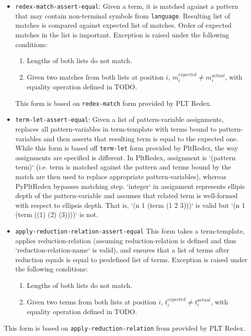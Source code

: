 \begin{itemize}
\item \texttt{redex-match-assert-equal}: Given a term, it is matched against a pattern that may contain non-terminal symbols from \texttt{language}. Resulting list of matches is compared against expected list of matches. Order of expected matches in the list is important. Exception is raised under the following conditions:
	\begin{enumerate}
	\item Lengths of both lists do not match.
	\item Given two matches from both lists at position $i$, $m_i^{expected} \neq m_i^{actual}$, with equality operation defined in TODO.
	\end{enumerate}
	This form is based on \texttt{redex-match} form provided by PLT Redex.

\item \texttt{term-let-assert-equal}: Given a list of pattern-variable assignments, replaces all pattern-variables in term-template with terms bound to pattern-variables and then asserts that resulting term is equal to the expected one.  While this form is based off \texttt{term-let} form provided by PltRedex, the way assignments are specified is different. In PltRedex, assignment is `(pattern term)` (i.e. term is matched against the pattern and terms bound by the match are then used to replace appropriate pattern-variables), whereas PyPltRedex bypasses matching step. `integer` in assignment represents ellipis depth of the pattern-variable and assumes that related term is well-formed with respect to ellipsis depth. That is, `(n 1 (term (1 2 3)))` is valid but `(n 1 (term ((1) (2) (3))))` is not.

\item \texttt{apply-reduction-relation-assert-equal} This form takes a term-template, applies reduction-relation (assuming reduction-relation is defined and thus `reduction-relation-name` is valid), and ensures that a list of terms after reduction equals is equal to predefined list of terms. Exception is raised under the following conditions:

	\begin{enumerate}
	\item Lengths of both lists do not match.
	\item Given two terms from both lists at position $i$, $t_i^{expected} \neq t_i^{actual}$, with equality operation defined in TODO.
	\end{enumerate}
\end{itemize}
This form is based on \texttt{apply-reduction-relation} from provided by PLT Redex.
